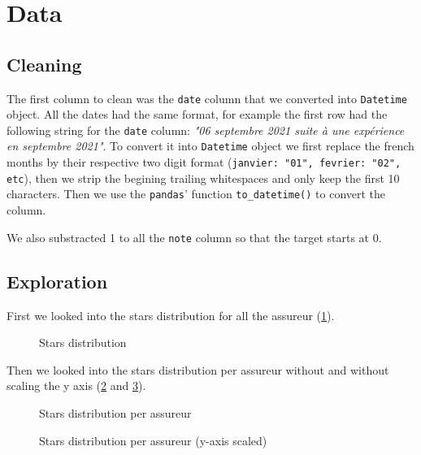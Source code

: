 \documentclass[a4paper, 12pt, one column]{article}
\begin{document}

\newpage


\section{Data}

\subsection{Cleaning}

The first column to clean was the \lstinline{date} column that we converted into \lstinline{Datetime} object.
All the dates had the same format, for example the first row had the following string for the \lstinline{date} column: \textit{"06 septembre 2021 suite à une expérience en septembre 2021"}.
To convert it into \lstinline[language=python]{Datetime} object we first replace the french months by their respective two digit format (\lstinline{janvier: "01", fevrier: "02", etc}), then we strip the begining trailing whitespaces and only keep the first 10 characters. Then we use the \lstinline{pandas}' function \lstinline{to_datetime()} to convert the column.

We also substracted 1 to all the \lstinline{note} column so that the target starts at 0.



\subsection{Exploration}

First we looked into the stars distribution for all the assureur (\cref{fig:distrib}).


\begin{figure}[H]
    \centering
    
    \caption{Stars distribution}
    \label{fig:distrib}
\end{figure}

Then we looked into the stars distribution per assureur without and without scaling the y axis (\cref{fig:distrib_split_noscale} and \cref{fig:distrib_split_scale}).

\begin{figure}[H]
    \advance\leftskip-3cm
    
    \caption{Stars distribution per assureur}
    \label{fig:distrib_split_noscale}
\end{figure}


\begin{figure}[H]
    \advance\leftskip-3cm
    
    \caption{Stars distribution per assureur (y-axis scaled)}
    \label{fig:distrib_split_scale}
\end{figure}
\end{document}
